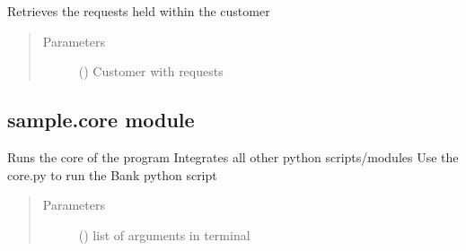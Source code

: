\documentclass[letterpaper,10pt,english]{sphinxmanual}
\begin{document}
\begin{fulllineitems}
\begin{fulllineitems}
\end{fulllineitems}


\begin{fulllineitems}
\label{\detokenize{sample:sample.bankTeller.BankTeller.viewRequests}}
Retrieves the requests held within the customer
\begin{quote}\begin{description}
\item[{Parameters}] \leavevmode
{} ({\hyperref[\detokenize{sample:sample.customer.Customer}]{}}) \textendash{} Customer with requests

\end{description}\end{quote}

\end{fulllineitems}


\end{fulllineitems}



\subsection{sample.core module}
\label{\detokenize{sample:sample-core-module}}\label{\detokenize{sample:module-sample.core}}

\begin{fulllineitems}
\label{\detokenize{sample:sample.core.main}}
Runs the core of the program
Integrates all other python scripts/modules
Use the core.py to run the Bank python script
\begin{quote}\begin{description}
\item[{Parameters}] \leavevmode
{} () \textendash{} list of arguments in terminal

\end{description}\end{quote}

\end{fulllineitems}
\end{document}
